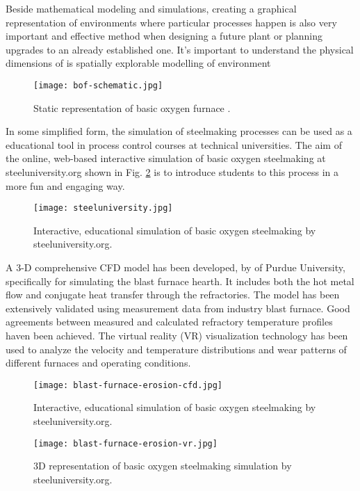 Beside mathematical modeling and simulations, creating a graphical representation of environments where particular processes happen is also very important and effective method when designing a future plant or planning upgrades to an already established one. It's important to understand the physical dimensions of  is  spatially explorable modelling of environment

\begin{figure}[h!]
	\centering
	\texttt{[image: bof-schematic.jpg]}
	\caption{Static representation of basic oxygen furnace \citep{Doh2013}.}
	\label{o:m4}
\end{figure}

In some simplified form, the simulation of steelmaking processes can be used as a educational tool in process control courses at technical universities. The aim of the online, web-based interactive simulation of basic oxygen steelmaking at steeluniversity.org shown in Fig. \ref{o:m5} is to introduce students to this process in a more fun and engaging way.

\begin{figure}[h!]
	\centering
	\texttt{[image: steeluniversity.jpg]}
	\caption{Interactive, educational simulation of basic oxygen steelmaking by steeluniversity.org.}
	\label{o:m5}
\end{figure}

A 3-D comprehensive CFD model has been developed, by \citet{Zheng2014} of Purdue University, specifically for simulating the blast furnace hearth. It includes both the hot metal flow and conjugate heat transfer through the refractories. The model has been extensively validated using measurement data from
industry blast furnace. Good agreements between measured and calculated refractory temperature profiles haven been achieved. The virtual reality (VR) visualization technology has been used to analyze the velocity and temperature distributions and wear patterns of different furnaces and operating conditions.

\begin{figure}[h!]
	\centering
	\texttt{[image: blast-furnace-erosion-cfd.jpg]}
	\caption{Interactive, educational simulation of basic oxygen steelmaking by steeluniversity.org.}
	\label{o:m6}
\end{figure}

\begin{figure}[h!]
	\centering
	\texttt{[image: blast-furnace-erosion-vr.jpg]}
	\caption{3D representation of basic oxygen steelmaking simulation by steeluniversity.org.}
	\label{o:m7}
\end{figure}


